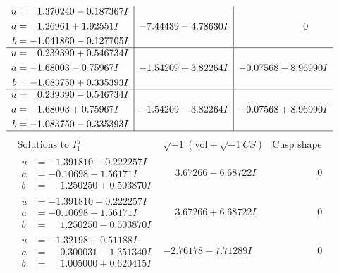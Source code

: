 \documentclass[1p]{elsarticle_modified}
\theoremstyle{definition}
\newcommand{\I}{\sqrt{-1}}
\begin{document}
$$\begin{array}{c|c|c}
\begin{aligned}
u &= \phantom{-}1.370240 - 0.187367 I \\
a &= \phantom{-}1.26961 + 1.92551 I \\
b &= -1.041860 - 0.127705 I\end{aligned}
 & -7.44439 - 4.78630 I & \phantom{-0.000000 } 0 \\ \hline\begin{aligned}
u &= \phantom{-}0.239390 + 0.546734 I \\
a &= -1.68003 - 0.75967 I \\
b &= -1.083750 + 0.335393 I\end{aligned}
 & -1.54209 + 3.82264 I & -0.07568 - 8.96990 I \\ \hline\begin{aligned}
u &= \phantom{-}0.239390 - 0.546734 I \\
a &= -1.68003 + 0.75967 I \\
b &= -1.083750 - 0.335393 I\end{aligned}
 & -1.54209 - 3.82264 I & -0.07568 + 8.96990 I\\
 \hline 
 \end{array}$$\newpage$$\begin{array}{c|c|c}  
\text{Solutions to }I^u_{1}& \I (\text{vol} + \sqrt{-1}CS) & \text{Cusp shape}\\
 \hline 
\begin{aligned}
u &= -1.391810 + 0.222257 I \\
a &= -0.10698 - 1.56171 I \\
b &= \phantom{-}1.250250 + 0.503870 I\end{aligned}
 & \phantom{-}3.67266 - 6.68722 I & \phantom{-0.000000 } 0 \\ \hline\begin{aligned}
u &= -1.391810 - 0.222257 I \\
a &= -0.10698 + 1.56171 I \\
b &= \phantom{-}1.250250 - 0.503870 I\end{aligned}
 & \phantom{-}3.67266 + 6.68722 I & \phantom{-0.000000 } 0 \\ \hline\begin{aligned}
u &= -1.32198 + 0.51188 I \\
a &= \phantom{-}0.300031 - 1.351340 I \\
b &= \phantom{-}1.005000 + 0.620415 I\end{aligned}
 & -2.76178 - 7.71289 I & \phantom{-0.000000 } 0 \\ \hline\begin{aligned}

\end{aligned}
\end{array}$$
\end{document}
